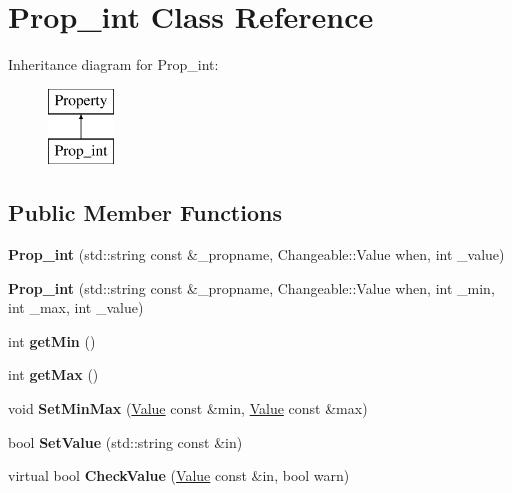 \hypertarget{classProp__int}{\section{Prop\-\_\-int Class Reference}
\label{classProp__int}
}
Inheritance diagram for Prop\-\_\-int\-:\begin{figure}[H]
\begin{center}
\leavevmode
\includegraphics[height=2.000000cm]{classProp__int}
\end{center}
\end{figure}
\subsection*{Public Member Functions}
\begin{DoxyCompactItemize}
\item 
\hypertarget{classProp__int_ab8c1f3f50ceaf2e36e3aab48253d2250}{{\bfseries Prop\-\_\-int} (std\-::string const \&\-\_\-propname, Changeable\-::\-Value when, int \-\_\-value)}\label{classProp__int_ab8c1f3f50ceaf2e36e3aab48253d2250}

\item 
\hypertarget{classProp__int_ac60562cfca6336553db06cf561819bb7}{{\bfseries Prop\-\_\-int} (std\-::string const \&\-\_\-propname, Changeable\-::\-Value when, int \-\_\-min, int \-\_\-max, int \-\_\-value)}\label{classProp__int_ac60562cfca6336553db06cf561819bb7}

\item 
\hypertarget{classProp__int_aad26bd6a145d1ca391951ae4b15e625d}{int {\bfseries get\-Min} ()}\label{classProp__int_aad26bd6a145d1ca391951ae4b15e625d}

\item 
\hypertarget{classProp__int_ac2c53ae3bfb50553e3dc518c19df83db}{int {\bfseries get\-Max} ()}\label{classProp__int_ac2c53ae3bfb50553e3dc518c19df83db}

\item 
\hypertarget{classProp__int_a5ddfd86051b921d5102fa76649bc145a}{void {\bfseries Set\-Min\-Max} (\hyperlink{classValue}{Value} const \&min, \hyperlink{classValue}{Value} const \&max)}\label{classProp__int_a5ddfd86051b921d5102fa76649bc145a}

\item 
\hypertarget{classProp__int_ad4aa382f6c4d02d5fd465e592ca50fdc}{bool {\bfseries Set\-Value} (std\-::string const \&in)}\label{classProp__int_ad4aa382f6c4d02d5fd465e592ca50fdc}

\item 
\hypertarget{classProp__int_a083e5487ae2544d805324fe8b0d3bc7d}{virtual bool {\bfseries Check\-Value} (\hyperlink{classValue}{Value} const \&in, bool warn)}\label{classProp__int_a083e5487ae2544d805324fe8b0d3bc7d}

\end{DoxyCompactItemize}


